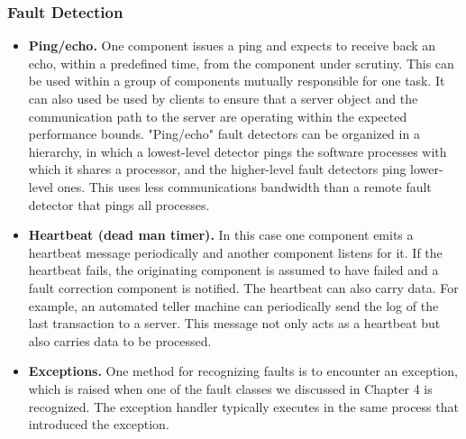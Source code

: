 \documentclass[a4paper]{article}
\begin{document}
\subsubsection{Fault Detection}
\begin{itemize}
  \item
    \textbf{Ping/echo.}
    One component issues a ping and expects to receive back an echo, within a predefined time, from the component under scrutiny. This can be used within a group of components mutually responsible for one task. It can also used be used by clients to ensure that a server object and the communication path to the server are operating within the expected performance bounds. "Ping/echo" fault detectors can be organized in a hierarchy, in which a lowest-level detector pings the software processes with which it shares a processor, and the higher-level fault detectors ping lower-level ones. This uses less communications bandwidth than a remote fault detector that pings all processes.
  \item
    \textbf{Heartbeat (dead man timer).}
    In this case one component emits a heartbeat message periodically and another component listens for it. If the heartbeat fails, the originating component is assumed to have failed and a fault correction component is notified. The heartbeat can also carry data. For example, an automated teller machine can periodically send the log of the last transaction to a server. This message not only acts as a heartbeat but also carries data to be processed.
  \item
    \textbf{Exceptions.}
    One method for recognizing faults is to encounter an exception, which is raised when one of the fault classes we discussed in Chapter 4 is recognized. The exception handler typically executes in the same process that introduced the exception.
\end{itemize}
  
\end{document}
